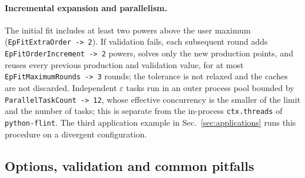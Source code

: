 \documentclass[11pt,a4paper]{article}
\begin{document}
\paragraph{Incremental expansion and parallelism.}
The initial fit includes at least two powers above the user maximum
(\texttt{EpFitExtraOrder -> 2}). If validation fails, each subsequent round adds
\texttt{EpFitOrderIncrement -> 2} powers, solves only the new production points, and reuses
every previous production and validation value, for at most \texttt{EpFitMaximumRounds -> 3}
rounds; the tolerance is not relaxed and the caches are not discarded. Independent
$\varepsilon$ tasks run in an outer process pool bounded by \texttt{ParallelTaskCount -> 12},
whose effective concurrency is the smaller of the limit and the number of tasks; this is
separate from the in-process \texttt{ctx.threads} of \texttt{python-flint}.
The third application example in Sec.~\ref{sec:applications} runs this procedure on a divergent
configuration.

\subsection{Options, validation and common pitfalls}
\label{sec:options}
\end{document}
